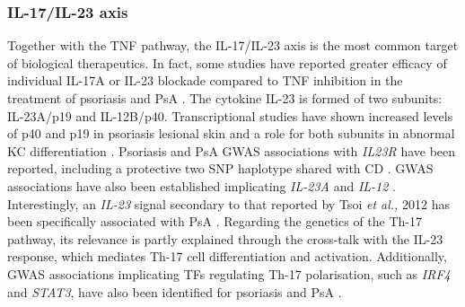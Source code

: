 \subsubsection*{IL-17/IL-23 axis}
Together with the TNF pathway, the IL-17/IL-23 axis is the most common target of biological therapeutics. In fact, some studies have reported greater efficacy of individual IL-17A or IL-23 blockade compared to TNF inhibition in the treatment of psoriasis and PsA \parencite{Griffiths2015,Blauvelt2017}. 
The cytokine IL-23 is formed of two subunits: IL-23A/p19 and IL-12B/p40. Transcriptional studies have shown increased levels of p40 and p19 in psoriasis lesional skin and a role for both subunits in abnormal KC differentiation \parencite{Lee2004,Zhu2011}. Psoriasis and PsA GWAS associations with \textit{IL23R} have been reported, including a protective two SNP haplotype shared with CD \parencite{Nair2008, Strange2010, Tsoi2012}. GWAS associations have also been established implicating \textit{IL-23A} and \textit{IL-12} \parencite{Cargill2007,Strange2010,Tsoi2012}.
Interestingly, an \textit{IL-23} signal secondary to that reported by Tsoi \textit{et al.,} 2012 has been specifically associated with PsA \parencite{Tsoi2012,Bowes2015}. Regarding the genetics of the Th-17 pathway, its relevance is partly explained through the cross-talk with the IL-23 response, which mediates Th-17 cell differentiation and activation. Additionally, GWAS associations implicating TFs regulating Th-17 polarisation, such as \textit{IRF4} and \textit{STAT3}, have also been identified for psoriasis and PsA \parencite{ Tsoi2012,Huber2008,Harris2007}. 

